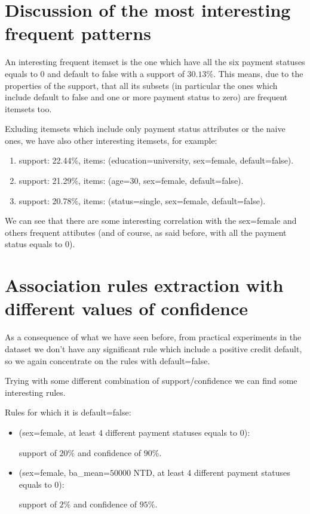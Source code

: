 \section{Discussion of the most interesting frequent patterns}

An interesting frequent itemset is the one which have all the six payment statuses equals to $0$ and default to false with a support of $30.13\%$. This means, due to the properties of the support, that all its subsets (in particular the ones which include default to false and one or more payment status to zero) are frequent itemsets too.

\smallskip

Exluding itemsets which include only payment status attributes or the naive ones, we have also other interesting itemsets, for example:

\begin{enumerate}
  \item support: 22.44\%, items: (education=university, sex=female, default=false).
  \item support: 21.29\%, items: (age=30, sex=female, default=false).
  \item support: 20.78\%, items: (status=single, sex=female, default=false).
\end{enumerate}

We can see that there are some interesting correlation with the sex=female and others frequent attibutes (and of course, as said before, with all the payment status equals to 0).

\section{Association rules extraction with different values of confidence}

As a consequence of what we have seen before, from practical experiments in the dataset we don't have any significant rule which include a positive credit default, so we again concentrate on the rules with default=false.

\medskip

Trying with some different combination of support/confidence we can find some interesting rules.

Rules for which it is default=false:

\begin{itemize}
  \item (sex=female, at least $4$ different payment statuses equals to 0):
  
  \tab support of $20\%$ and confidence of $90\%$.

  \item (sex=female, ba\_mean=$50000$ NTD, at least $4$ different payment statuses equals to 0):
  
  \tab support of $2\%$ and confidence of $95\%$.

\end{itemize}

